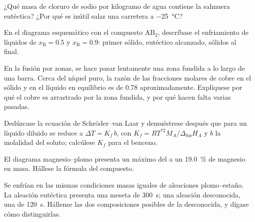 \begin{exercise}[$\star\star$]\label{exo:b2:solid-liquid-diagrams:7}
¿Qué masa de cloruro de sodio por kilogramo de agua contiene la salmuera
eutéctica? ¿Por qué es inútil salar una carretera a \qty{-25}{\degreeCelsius}?
\end{exercise}

\begin{exercise}[$\star\star$]\label{exo:b2:solid-liquid-diagrams:8}
En el diagrama esquemático con el compuesto $\mathrm{AB_2}$, descríbase el
enfriamiento de líquidos de $x_{\mathrm B} = 0.5$ y $x_{\mathrm B} = 0.9$: primer
sólido, eutéctico alcanzado, sólidos al final.
\end{exercise}

\begin{exercise}[$\star\star$]\label{exo:b2:solid-liquid-diagrams:9}
En la fusión por zonas, se hace pasar lentamente una zona fundida a lo largo de una barra. Cerca del níquel puro,
la razón de las fracciones molares de cobre en el sólido y en el líquido en
equilibrio es de 0.78 aproximadamente. Explíquese por qué el cobre es arrastrado por la
zona fundida, y por qué hacen falta varias pasadas.
\end{exercise}

\begin{exercise}[$\star\star\star$]\label{exo:b2:solid-liquid-diagrams:10}
Dedúzcase la ecuación de Schröder--van Laar y demuéstrese después que para un líquido diluido
se reduce a $\Delta T = K_f\,b$, con $K_f = RT^{*2}M_A/\Delta_{\text{fus}}H_A$
y $b$ la molalidad del soluto; calcúlese $K_f$ para el benceno.
\end{exercise}

\begin{exercise}[$\star\star\star$]\label{exo:b2:solid-liquid-diagrams:11}
El diagrama magnesio--plomo presenta un máximo del  a un 19.0~\% de magnesio en
masa. Hállese la fórmula del compuesto.
\end{exercise}

\begin{exercise}[$\star\star\star$]\label{exo:b2:solid-liquid-diagrams:12}
Se enfrían en las mismas condiciones masas iguales de aleaciones plomo--estaño. La
aleación eutéctica presenta una meseta de \qty{300}{s}; una aleación desconocida, una de
\qty{120}{s}. Hállense las dos composiciones posibles de la desconocida, y dígase cómo
distinguirlas.
\end{exercise}

